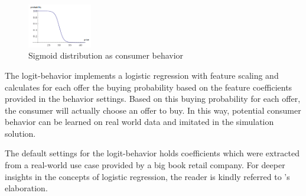 %
\begin{figure}[h]
    \centering
    \includegraphics[width=0.25\textwidth]{images/sigmoid.png}
    \caption{Sigmoid distribution as consumer behavior}
    \label{fig:sigmoid_distribution}
\end{figure}
%

The logit-behavior implements a logistic regression with feature scaling and calculates for each offer the buying probability based on the feature coefficients provided in the behavior settings. Based on this buying probability for each offer, the consumer will actually choose an offer to buy. In this way, potential consumer behavior can be learned on real world data and imitated in the simulation solution.

The default settings for the logit-behavior holds coefficients which were extracted from a real-world use case provided by a big book retail company. For deeper insights in the concepts of logistic regression, the reader is kindly referred to \citet{hosmer2013applied}'s elaboration.

%
